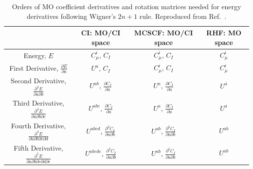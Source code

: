 \begin{table}
  \centering
  \caption[MO coefficient derivatives and rotation matrices needed for energy derivatives]{Orders of MO coefficient derivatives and rotation matrices needed for energy derivatives following Wigner's \(2n+1\) rule. Reproduced from Ref.~\parencite{Yamaguchi1994}.}
  \label{tutorial:tab:wigner}
  \begin{tabular}{cccc}
    \toprule
    & CI: MO/CI space & MCSCF: MO/CI space & RHF: MO space \\
    \midrule
    Energy, \(E\) & \(C_{\mu}^{i}\), \(C_{I}\) & \(C_{\mu}^{i}\), \(C_{I}\) & \(C_{\mu}^{i}\) \\
    First Derivative, \(\frac{\partial E}{\partial a}\) & \(U^{a}\), \(C_{I}\) & \(C_{\mu}^{i}\), \(C_{I}\) & \(C_{\mu}^{i}\) \\
    Second Derivative, \(\frac{\partial^{2} E}{\partial a \partial b}\) & \(U^{ab}\), \(\frac{\partial C_{I}}{\partial a}\) & \(U^{a}\), \(\frac{\partial C_{I}}{\partial a}\) & \(U^{a}\) \\
    Third Derivative, \(\frac{\partial^{3} E}{\partial a \partial b \partial c}\) & \(U^{abc}\), \(\frac{\partial C_{I}}{\partial a}\) & \(U^{a}\), \(\frac{\partial C_{I}}{\partial a}\) & \(U^{a}\) \\
    Fourth Derivative, \(\frac{\partial^{4} E}{\partial a \partial b \partial c \partial d}\) & \(U^{abcd}\), \(\frac{\partial^{2} C_{I}}{\partial a \partial b}\) & \(U^{ab}\), \(\frac{\partial^{2} C_{I}}{\partial a \partial b}\) & \(U^{ab}\) \\
    Fifth Derivative, \(\frac{\partial^{5} E}{\partial a \partial b \partial c \partial d \partial e}\) & \(U^{abcde}\), \(\frac{\partial^{2} C_{I}}{\partial a \partial b}\) & \(U^{ab}\), \(\frac{\partial^{2} C_{I}}{\partial a \partial b}\) & \(U^{ab}\) \\
    \bottomrule
  \end{tabular}
\end{table}

